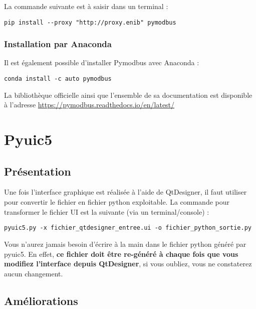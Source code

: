 La commande suivante est à saisir dans un terminal :
\begin{lstlisting}
pip install --proxy "http://proxy.enib" pymodbus
\end{lstlisting}

\subsubsection{Installation par Anaconda}
 Il est également possible d'installer Pymodbus avec Anaconda : 
\begin{lstlisting}
conda install -c auto pymodbus
\end{lstlisting}

La bibliothèque officielle ainsi que l'ensemble de sa documentation est disponible à l'adresse \url{https://pymodbus.readthedocs.io/en/latest/} \newline 

\section{Pyuic5}

\subsection{Présentation}

Une fois l'interface graphique est réalisée à l'aide de QtDesigner, il faut utiliser  pour convertir le fichier  en fichier python exploitable.\newline
La commande pour transformer le fichier UI est la suivante (via un terminal/console) :
\begin{lstlisting}
pyuic5.py -x fichier_qtdesigner_entree.ui -o fichier_python_sortie.py
\end{lstlisting}

Vous n'aurez jamais besoin d'écrire à la main dans le fichier python généré par pyuic5. En effet, \textbf{ce fichier doit être re-généré à chaque fois que vous modifiez l'interface depuis QtDesigner}, si vous oubliez,  vous ne constaterez aucun changement.

\subsection{Améliorations}

